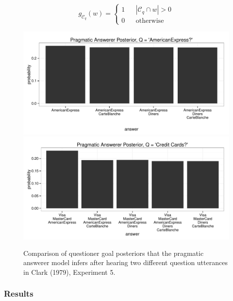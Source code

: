 \documentclass[12pt, floatsintext, jou]{apa6}
\begin{document}
$$g_{\mathcal{C}_q}(w) = \left\{\begin{array}{rcl} 1 && | \mathcal{C}_q \cap w | > 0 \\ 0 && \textrm{otherwise}\end{array}\right.$$
 \begin{figure}[t!]
\begin{center}
\includegraphics[scale = .6]{americanExpressPosterior.pdf}
\includegraphics[scale = .6]{creditCardsPosterior.pdf}
\end{center}
\vspace{-.25cm}
\caption{Comparison of questioner goal posteriors that the pragmatic answerer model infers after hearing two different question utterances in Clark (1979), Experiment 5.}
\label{fig:clarkExperiment5posteriors}
\end{figure}

\subsubsection{Results}
\end{document}
